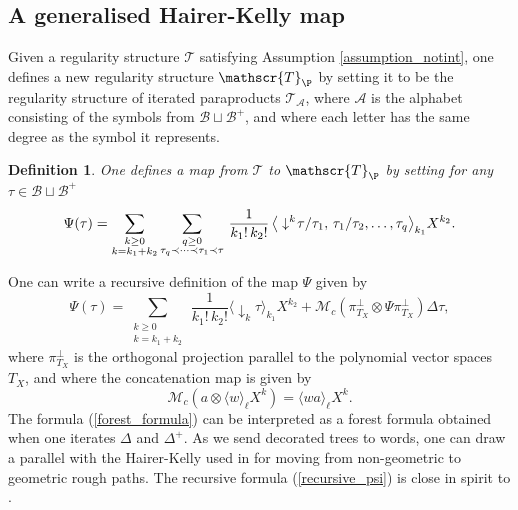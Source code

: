 \documentclass[11pt]{preprint}
\newcommand{\mcM}{\mathcal{M}}
\newcommand{\mcA}{\mathcal{A}}
\newcommand{\mcB}{\mathcal{B}}
\newcommand{\mcT}{\mathcal{T}}
\newcounter{theorem}
\newtheorem{defi}[theorem]{Definition}
\def\eqref#1{(\ref{#1})}
\renewcommand{\lg}{\langle}
\newcommand{\rg}{\rangle}
\newcommand{\scrT}{\mathscr{T}}
\begin{document}
	
	
	
	
	
	\subsection{A generalised Hairer-Kelly map}\label{subsect_HairerKelly}
	Given a regularity structure $\scrT$ satisfying Assumption \ref{assumption_notint}, one defines a new regularity structure $\scrT_\P$ by setting it to be the regularity structure of iterated paraproducts $\mcT_\mcA$, where $\mcA$ is the alphabet consisting of the symbols from $\mcB\sqcup \mcB^+ $, and where each letter has the same degree as the symbol it represents.
	
	
	\begin{defi}\label{def_Psitau}
		One defines a map from $\scrT$ to $\scrT_\P$ by setting for any $\tau\in\mcB \sqcup \mcB^+$
		\begin{equation} \label{forest_formula}
			\Psi(\tau) = \sum_{\substack{k\geq 0 \\  k=k_1+k_2}} \sum_{\substack{q\geq 0 \\ \tau_q\prec\dots\prec\tau_1\prec\tau}} \, \frac{1}{k_1!\, k_2!} \, \big\lg \downarrow^k\hspace{-2pt}\tau/\tau_1,\, \tau_1/\tau_2, \dots, \tau_q \big\rg_{k_1} X^{k_2}.
		\end{equation}
	\end{defi}
		One can write a recursive definition of the map $ \Psi $ given by
	\begin{equation} \label{recursive_psi}
	\Psi(\tau) = \sum_{\substack{k\geq 0 \\  k=k_1+k_2}} \, \frac{1}{k_1!\, k_2!} \lg \downarrow_k \tau  \rg_{k_1}  X^{k_2} + \mcM_c (\pi_{T_X}^\perp \otimes \Psi \pi_{T_X}^\perp ) \Delta \tau,
\end{equation}
	where $\pi_{T_X}^\perp$ is the  orthogonal projection parallel to the polynomial vector spaces $T_X$, and where the concatenation map is given by
	$$
	\mcM_c( a\otimes  \lg w\rg_\ell X^k   ) =  \lg wa \rg_{\ell} X^{k}.
	$$
	 The formula \eqref{forest_formula} can be interpreted as a forest formula obtained when one iterates $ \Delta $ and $\Delta^{\!+}$. As we send decorated trees to words, one can draw a parallel with the Hairer-Kelly used in \cite{HK15} for moving from non-geometric to geometric rough paths. The recursive formula \eqref{recursive_psi} is close in spirit to \cite{BCEF20}.
\end{document}

